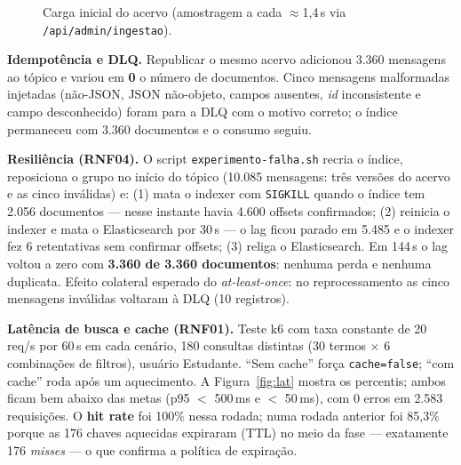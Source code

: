 \documentclass[12pt]{article}
\newcommand{\cod}[1]{\texttt{\small #1}}
\begin{document}
\begin{figure}[ht]
\centering
{}
\caption{Carga inicial do acervo (amostragem a cada $\approx$1,4\,s via \cod{/api/admin/ingestao}).}
\label{fig:lag}
\end{figure}

\textbf{Idempotência e DLQ.} Republicar o mesmo acervo adicionou 3.360 mensagens ao tópico e variou em
\textbf{0} o número de documentos. Cinco mensagens malformadas injetadas (não-JSON, JSON não-objeto, campos
ausentes, \textit{id} inconsistente e campo desconhecido) foram para a DLQ com o motivo correto; o índice
permaneceu com 3.360 documentos e o consumo seguiu.

\textbf{Resiliência (RNF04).} O script \cod{experimento-falha.sh} recria o índice, reposiciona o grupo no início
do tópico (10.085 mensagens: três versões do acervo e as cinco inválidas) e: (1) mata o indexer com
\cod{SIGKILL} quando o índice tem 2.056 documentos --- nesse instante havia 4.600 offsets confirmados; (2)
reinicia o indexer e mata o Elasticsearch por 30\,s --- o lag ficou parado em 5.485 e o indexer fez 6
retentativas sem confirmar offsets; (3) religa o Elasticsearch. Em 144\,s o lag voltou a zero com
\textbf{3.360 de 3.360 documentos}: nenhuma perda e nenhuma duplicata. Efeito colateral esperado do
\textit{at-least-once}: no reprocessamento as cinco mensagens inválidas voltaram à DLQ (10 registros).

\textbf{Latência de busca e cache (RNF01).} Teste k6 com taxa constante de 20\,req/s por 60\,s em cada cenário,
180 consultas distintas (30 termos $\times$ 6 combinações de filtros), usuário Estudante. ``Sem cache'' força
\cod{cache=false}; ``com cache'' roda após um aquecimento. A Figura~\ref{fig:lat} mostra os percentis; ambos
ficam bem abaixo das metas (p95 $<$ 500\,ms e $<$ 50\,ms), com 0 erros em 2.583 requisições. O
\textbf{hit rate} foi 100\% nessa rodada; numa rodada anterior foi 85,3\% porque as 176 chaves aquecidas
expiraram (TTL) no meio da fase --- exatamente 176 \textit{misses} --- o que confirma a política de expiração.
\end{document}
